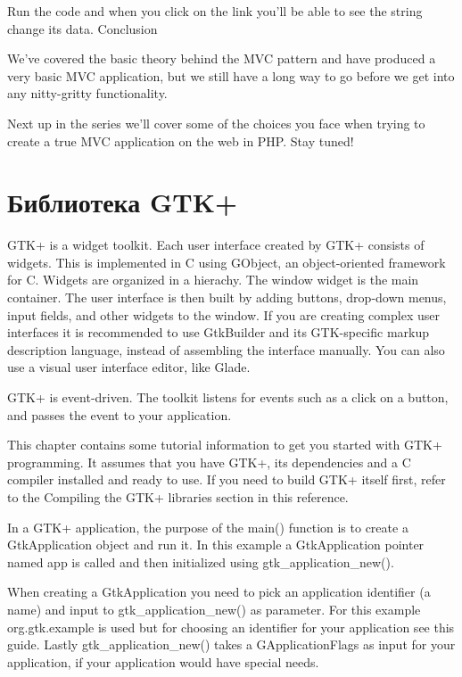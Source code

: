 \documentclass[a4paper,openany,twoside,draft]{book}
\begin{document}
Run the code and when you click on the link you’ll be able to see the string change its data.
Conclusion

We’ve covered the basic theory behind the MVC pattern and have produced a very basic MVC application, but we still have a long way to go before we get into any nitty-gritty functionality.

Next up in the series we’ll cover some of the choices you face when trying to create a true MVC application on the web in PHP. Stay tuned!

\section{Библиотека GTK+}
\label{sec:gtk}

GTK+ is a widget toolkit. Each user interface created by GTK+ consists of widgets. This is implemented in C using GObject, an object-oriented framework for C. Widgets are organized in a hierachy. The window widget is the main container. The user interface is then built by adding buttons, drop-down menus, input fields, and other widgets to the window. If you are creating complex user interfaces it is recommended to use GtkBuilder and its GTK-specific markup description language, instead of assembling the interface manually. You can also use a visual user interface editor, like Glade.

GTK+ is event-driven. The toolkit listens for events such as a click on a button, and passes the event to your application.

This chapter contains some tutorial information to get you started with GTK+ programming. It assumes that you have GTK+, its dependencies and a C compiler installed and ready to use. If you need to build GTK+ itself first, refer to the Compiling the GTK+ libraries section in this reference.

In a GTK+ application, the purpose of the main() function is to create a GtkApplication object and run it. In this example a GtkApplication pointer named app is called and then initialized using gtk\_application\_new().

When creating a GtkApplication you need to pick an application identifier (a name) and input to gtk\_application\_new() as parameter. For this example org.gtk.example is used but for choosing an identifier for your application see this guide. Lastly gtk\_application\_new() takes a GApplicationFlags as input for your application, if your application would have special needs.
\end{document}
